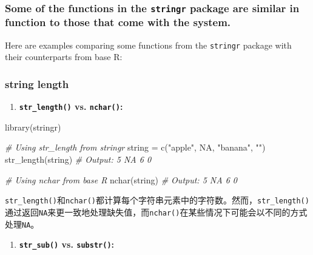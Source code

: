 \documentclass[
]{article}
\newenvironment{Shaded}{}{}
\newcommand{\CommentTok}[1]{\textcolor[rgb]{0.38,0.63,0.69}{\textit{#1}}}
\newcommand{\ConstantTok}[1]{\textcolor[rgb]{0.53,0.00,0.00}{#1}}
\newcommand{\FunctionTok}[1]{\textcolor[rgb]{0.02,0.16,0.49}{#1}}
\newcommand{\NormalTok}[1]{#1}
\newcommand{\OtherTok}[1]{\textcolor[rgb]{0.00,0.44,0.13}{#1}}
\newcommand{\StringTok}[1]{\textcolor[rgb]{0.25,0.44,0.63}{#1}}
\begin{document}
\hypertarget{some-of-the-functions-in-the-stringr-package-are-similar-in-function-to-those-that-come-with-the-system}{%
\subsubsection{\texorpdfstring{Some of the functions in the
\texttt{stringr} package are similar in function to those that come with
the
system.}{Some of the functions in the stringr package are similar in function to those that come with the system.}}\label{some-of-the-functions-in-the-stringr-package-are-similar-in-function-to-those-that-come-with-the-system}}

Here are examples comparing some functions from the \texttt{stringr}
package with their counterparts from base R:

\hypertarget{string-length}{%
\subsubsection{string length}\label{string-length}}

\begin{enumerate}
\def\labelenumi{\arabic{enumi}.}
\item
  \textbf{\texttt{str\_length()} vs. \texttt{nchar()}:}
\end{enumerate}

\begin{Shaded}
\begin{Highlighting}[]
\FunctionTok{library}\NormalTok{(stringr)}

\CommentTok{\# Using str\_length from stringr}
\NormalTok{string }\OtherTok{=} \FunctionTok{c}\NormalTok{(}\StringTok{"apple"}\NormalTok{, }\ConstantTok{NA}\NormalTok{, }\StringTok{"banana"}\NormalTok{, }\StringTok{""}\NormalTok{)}
\FunctionTok{str\_length}\NormalTok{(string)}
\CommentTok{\# Output: 5   NA   6   0}

\CommentTok{\# Using nchar from base R}
\FunctionTok{nchar}\NormalTok{(string)}
\CommentTok{\# Output: 5  NA   6   0}
\end{Highlighting}
\end{Shaded}

\texttt{str\_length()}和\texttt{nchar()}都计算每个字符串元素中的字符数。然而，\texttt{str\_length()}通过返回\texttt{NA}来更一致地处理缺失值，而\texttt{nchar()}在某些情况下可能会以不同的方式处理\texttt{NA}。

\begin{enumerate}
\def\labelenumi{\arabic{enumi}.}
\item
  \textbf{\texttt{str\_sub()} vs. \texttt{substr()}:}
\end{enumerate}
\end{document}
